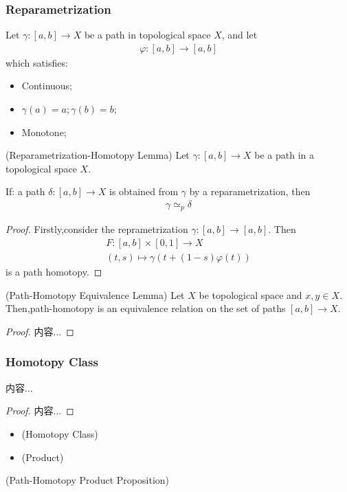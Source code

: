\documentclass[Total.tex]{subfiles}
\begin{document}
				\subsubsection{Reparametrization}
				\begin{Def}
					Let $\gamma:[a,b]\rightarrow X$ be a path in topological space $X$, and let
					\begin{gather*}
						\varphi:[a,b]\rightarrow [a,b]
					\end{gather*}
					which satisfies:
					\begin{itemize}
						\item Continuous;
						\item $\gamma(a)=a;\gamma(b)=b$;
						\item Monotone;
					\end{itemize}
				\end{Def}
					\begin{lemma}
						(Reparametrization-Homotopy Lemma) Let $\gamma:[a,b]\rightarrow X$ be a path in a topological space $X$.
						
						If: a path $\delta:[a,b]\rightarrow X$ is obtained from $\gamma$ by a reparametrization, then
						\begin{gather*}
							\gamma\simeq_p \delta
						\end{gather*}
					\end{lemma}
					\begin{proof}
						Firstly,consider the reprametrization $\gamma:[a,b]\rightarrow [a,b]$. Then
						\begin{gather*}
							F:[a,b]\times [0,1]\rightarrow X\\
							(t,s)\mapsto \gamma(t+(1-s)\varphi(t))
						\end{gather*}
						is a path homotopy.
					\end{proof}
					\begin{lemma}
						(Path-Homotopy Equivalence Lemma) Let $X$ be topological space and $x,y\in X$. Then,path-homotopy is an equivalence relation on the set of paths $[a,b]\rightarrow X$.
					\end{lemma}
					\begin{proof}
						内容...
					\end{proof}
				\subsubsection{Homotopy Class}
					
					\begin{lemma}
						内容...
					\end{lemma}
					\begin{proof}
						内容...
					\end{proof}
					\begin{Def}
						\begin{itemize}
							\item (Homotopy Class)
							\item (Product)
						\end{itemize}
					\end{Def}
					\begin{proposition}
						(Path-Homotopy Product Proposition)
					\end{proposition}
\end{document}
